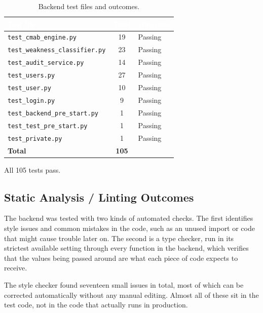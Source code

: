 \documentclass[a4paper, 12pt, oneside, openany, BCOR1cm,toc=chapterentrywithdots]{scrbook}
\newcommand{\thw}[1]{\textcolor{white}{\textbf{#1}}}
\begin{document}
\begin{table}[h]
\centering
{}
\begin{tabular}{l c l}
\toprule
\rowcolor{green!55!black}
\thw{Test file} & \thw{Tests} & \thw{Outcome} \\
\midrule
\texttt{test\_cmab\_engine.py} & 19 & Passing \\
\texttt{test\_weakness\_classifier.py} & 23 & Passing \\
\texttt{test\_audit\_service.py} & 14 & Passing \\
\texttt{test\_users.py} & 27 & Passing \\
\texttt{test\_user.py} & 10 & Passing \\
\texttt{test\_login.py} & 9 & Passing \\
\texttt{test\_backend\_pre\_start.py} & 1 & Passing \\
\texttt{test\_test\_pre\_start.py} & 1 & Passing \\
\texttt{test\_private.py} & 1 & Passing \\
\midrule
\textbf{Total} & \textbf{105} & \\
\bottomrule
\end{tabular}
\caption{Backend test files and outcomes.}
\label{tab:test-outcomes}
\end{table}

All 105 tests pass.

\subsection{Static Analysis / Linting Outcomes}

The backend was tested with two kinds of automated checks. The first identifies style issues and
common mistakes in the code, such as an unused import or code that might cause trouble later on.
The second is a type checker, run in its strictest available setting through every function in
the backend, which verifies that the values being passed around are what each piece of code
expects to receive.

The style checker found seventeen small issues in total, most of which can be corrected
automatically without any manual editing. Almost all of these sit in the test code, not in the
code that actually runs in production.
\end{document}

